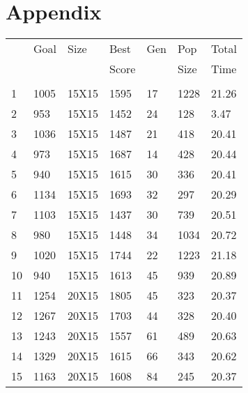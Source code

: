 \documentclass[14pt]{acmsiggraph}
\begin{document}
	\section{Appendix}
	\onecolumn
	\clearpage
	\begin{table}[h!]
		\footnotesize	
		\vspace{5pt}
		\begin{center}
			\subtable
			{
				\begin{tabular}{lllllll||}
					 & Goal   & Size   & Best & Gen & Pop & Total \\ 
					 &  &    & Score &   &  Size & Time \\ \hline \\
					1   & 1005 & 15X15  & \cellcolor[rgb]{1,0.76,0.43}1595    & 17  & 1228 & 21.26 \\
					2   & 953  & 15X15  & \cellcolor[rgb]{1,0.87,0.49}1452    & 24  & 128  & 3.47  \\
					3   & 1036 & 15X15  & \cellcolor[rgb]{0.92,0.88,0.48}1487 & 21  & 418  & 20.41 \\
					4   & 973  & 15X15  & \cellcolor[rgb]{1,0.49,0.27}1687    & 14  & 428  & 20.44 \\
					5   & 940  & 15X15  & \cellcolor[rgb]{1,0.52,0.29}1615    & 30  & 336  & 20.41 \\
					6   & 1134 & 15X15  & \cellcolor[rgb]{0.98,0.91,0.51}1693 & 32  & 297  & 20.29 \\
					7   & 1103 & 15X15  & \cellcolor[rgb]{0.77,0.82,0.41}1437 & 30  & 739  & 20.51 \\
					8   & 980  & 15X15  & \cellcolor[rgb]{0.97,0.9,0.5}1448   & 34  & 1034 & 20.72 \\
					9   & 1020 & 15X15  & \cellcolor[rgb]{1,0.53,0.3}1744     & 22  & 1223 & 21.18 \\
					10  & 940  & 15X15  & \cellcolor[rgb]{1,0.52,0.29}1613    & 45  & 939  & 20.89 \\
					11  & 1254 & 20X15  & \cellcolor[rgb]{0.92,0.89,0.48}1805 & 45  & 323  & 20.37 \\
					12  & 1267 & 20X15  & \cellcolor[rgb]{0.82,0.84,0.43}1703 & 44  & 328  & 20.40 \\
					13  & 1243 & 20X15  & \cellcolor[rgb]{0.72,0.8,0.39}1557  & 61  & 489  & 20.63 \\
					14  & 1329 & 20X15  & \cellcolor[rgb]{0.67,0.78,0.38}1615 & 66  & 343  & 20.62 \\
					15  & 1163 & 20X15  & \cellcolor[rgb]{0.86,0.86,0.45}1608 & 84  & 245  & 20.37 \\

\end{tabular}}
\end{center}
\end{table}
\end{document}
